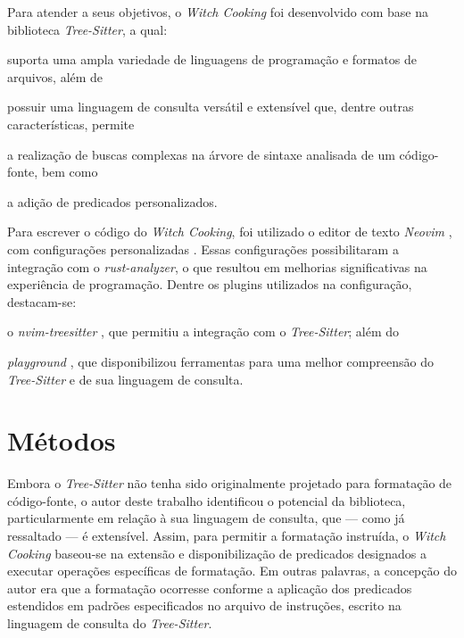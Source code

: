 \documentclass
  [11pt,a4paper,english,brazil,openright,sumario=tradicional,twoside]
  {abntex2}
\newcommand{\treesitter}{\textit{Tree-Sitter}\xspace}
\newcommand{\witchcooking}{\textit{Witch Cooking}\xspace}
\begin{document}
  Para atender a seus objetivos, o \witchcooking foi desenvolvido com base na
  biblioteca \treesitter \cite{tree-sitter-2018-tree}, a qual:
  \begin{inparaenum}
    \item suporta uma ampla variedade de linguagens de programação e formatos
          de arquivos, além de
    \item possuir uma linguagem de consulta versátil e extensível que, dentre
          outras características, permite
          \begin{inparaenum}
            \item a realização de buscas complexas na árvore de sintaxe
                  analisada de um código-fonte, bem como
            \item a adição de predicados personalizados.
          \end{inparaenum}
  \end{inparaenum}

  Para escrever o código do \witchcooking, foi utilizado o editor de texto
  \textit{Neovim} \cite{neovim-2023-hyperextensible}, com configurações
  personalizadas \cite{silva-2023-uma}. Essas configurações possibilitaram a
  integração com o \textit{rust-analyzer}, o que resultou em melhorias
  significativas na experiência de programação. Dentre os plugins utilizados na
  configuração, destacam-se:
  \begin{inparaenum}
    \item o \textit{nvim-treesitter} \cite{nvim-treesitter-2023-nvim}, que
          permitiu a integração com o \treesitter; além do
    \item \textit{playground} \cite{nvim-treesitter-2023-playground}, que
          disponibilizou ferramentas para uma melhor compreensão do \treesitter
          e de sua linguagem de consulta.
  \end{inparaenum}


  \section{Métodos}

  Embora o \treesitter não tenha sido originalmente projetado para formatação
  de código-fonte, o autor deste trabalho identificou o potencial da
  biblioteca, particularmente em relação à sua linguagem de consulta, que ---
  como já ressaltado --- é extensível. Assim, para permitir a formatação
  instruída, o \witchcooking baseou-se na extensão e disponibilização de
  predicados designados a executar operações específicas de formatação. Em
  outras palavras, a concepção do autor era que a formatação ocorresse conforme
  a aplicação dos predicados estendidos em padrões especificados no arquivo de
  instruções, escrito na linguagem de consulta do \treesitter.
\end{document}
